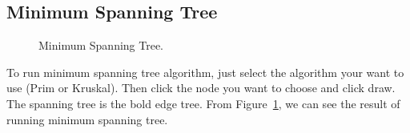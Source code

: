 \documentclass{article}
\begin{document}
\subsection{Minimum Spanning Tree}
\begin{figure}[H]
\centering
{}
   \caption{Minimum Spanning Tree.}
   \label{fig:minimum spanning tree}
\end{figure}
To run minimum spanning tree algorithm, just select the algorithm your want to use (Prim or Kruskal). Then click the node you want to choose and click draw. The spanning tree is the bold edge tree. From Figure~\ref{fig:minimum spanning tree}, we can see the result of running minimum spanning tree.\\
\end{document}
